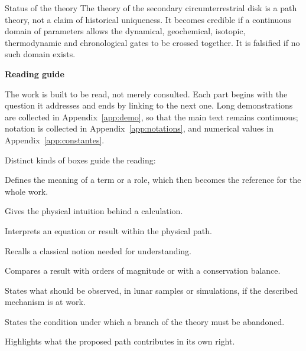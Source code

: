 \documentclass[11pt,a4paper,openany]{report}
\begin{document}
\begin{principe}{Status of the theory}
The theory of the secondary circumterrestrial disk is a path theory, not a
claim of historical uniqueness. It becomes credible if a continuous domain of
parameters allows the dynamical, geochemical, isotopic, thermodynamic and
chronological gates to be crossed together. It is falsified if no such domain
exists.
\end{principe}

\clearpage
\thispagestyle{plain}
\begin{center}{\Large\bfseries Reading guide}\end{center}
\medskip

The work is built to be read, not merely consulted. Each part begins with the question it
addresses and ends by linking to the next one. Long demonstrations are collected in
Appendix~\ref{app:demo}, so that the main text remains continuous; notation is collected in
Appendix~\ref{app:notations}, and numerical values in Appendix~\ref{app:constantes}.

Distinct kinds of boxes guide the reading:

\begin{definition}
Defines the meaning of a term or a role, which then becomes the reference for the whole work.
\end{definition}
\begin{ideephys}
Gives the physical intuition behind a calculation.
\end{ideephys}
\begin{lecture}
Interprets an equation or result within the physical path.
\end{lecture}
\begin{rappel}
Recalls a classical notion needed for understanding.
\end{rappel}
\begin{controle}
Compares a result with orders of magnitude or with a conservation balance.
\end{controle}
\begin{consequence}
States what should be observed, in lunar samples or simulations, if the described mechanism is at work.
\end{consequence}
\begin{falsif}
States the condition under which a branch of the theory must be abandoned.
\end{falsif}
\begin{apport}
Highlights what the proposed path contributes in its own right.
\end{apport}
\end{document}
